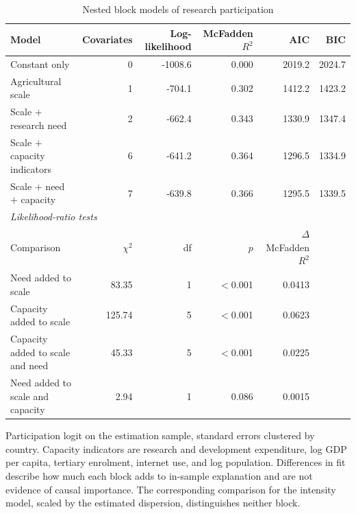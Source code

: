 \begin{table}[!t]
\centering
\footnotesize
\caption{Nested block models of research participation}
\label{tab:blocks}
\begin{tabular*}{\textwidth}{@{\extracolsep\fill}l r r r r r@{}}
\toprule
Model & Covariates & Log-likelihood & McFadden $R^2$ & AIC & BIC \\
\midrule
Constant only & 0 & -1008.6 & 0.000 & 2019.2 & 2024.7 \\
Agricultural scale & 1 & -704.1 & 0.302 & 1412.2 & 1423.2 \\
Scale $+$ research need & 2 & -662.4 & 0.343 & 1330.9 & 1347.4 \\
Scale $+$ capacity indicators & 6 & -641.2 & 0.364 & 1296.5 & 1334.9 \\
Scale $+$ need $+$ capacity & 7 & -639.8 & 0.366 & 1295.5 & 1339.5 \\
\midrule
\multicolumn{6}{l}{\textit{Likelihood-ratio tests}} \\
Comparison & $\chi^2$ & df & $p$ & $\Delta$ McFadden $R^2$ & \\
Need added to scale & 83.35 & 1 & $<$0.001 & 0.0413 & \\
Capacity added to scale & 125.74 & 5 & $<$0.001 & 0.0623 & \\
Capacity added to scale and need & 45.33 & 5 & $<$0.001 & 0.0225 & \\
Need added to scale and capacity & 2.94 & 1 & 0.086 & 0.0015 & \\
\bottomrule
\end{tabular*}
\begin{tablenotes}
\item[] Participation logit on the estimation sample, standard errors clustered by country. Capacity indicators are research and development expenditure, log GDP per capita, tertiary enrolment, internet use, and log population. Differences in fit describe how much each block adds to in-sample explanation and are not evidence of causal importance. The corresponding comparison for the intensity model, scaled by the estimated dispersion, distinguishes neither block.
\end{tablenotes}
\end{table}
